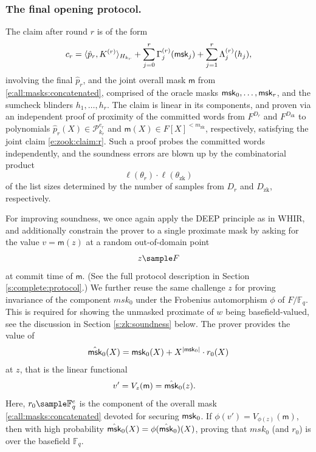 \subsubsection{The final opening protocol.}

The claim after round $r$ is of the form
\begin{equation}
\label{e:zook:claim:r}
c_r  = \langle \hat p_r, K^{(r)} \rangle_{H_{k_r}} 
+ \sum_{j=0}^r  \Gamma_j^{(r)}(\mathsf{msk}_j) + \sum_{j=1}^r \Lambda_j^{(r)}(h_j),
\end{equation}
involving the final $\hat p_r$, and the joint overall mask $\mathsf m$ from \eqref{e:all:masks:concatenated}, comprised of the oracle masks $\mathsf{msk}_0,\ldots,\mathsf{msk}_r$, and the sumcheck blinders $h_1,\ldots, h_r$.
The claim is linear in its components, and proven via an independent proof of proximity of the committed words from $F^{D_r}$ and $F^{D_\text{zk}}$ to polynomials $\hat p_r(X)\in \mathscr P_{k_r}^{e_r}$ and $\mathsf m(X) \in F[X]^{<m_\text{zk}}$, respectively, satisfying the joint claim \eqref{e:zook:claim:r}.
Such a proof probes the committed words independently, and the soundness errors are blown up by the combinatorial product
\[
\ell(\theta_r) \cdot \ell(\theta_\text{zk})
\]
of the list sizes determined by the number of samples from $D_r$ and $D_\text{zk}$, respectively.

For improving soundness, we once again apply the DEEP principle as in WHIR, and additionally constrain the prover to a single proximate mask by asking for the value 
$
v =\mathsf m(z)
$
at a random out-of-domain point 
\begin{equation}
z\sample F
\end{equation} at commit time of $\mathsf m$. 
(See the full protocol description in Section \ref{s:complete:protocol}.)
We further reuse the same challenge $z$ for proving invariance of the component $msk_0$ under the Frobenius automorphism $\phi$ of $F/\mathbb F_q$. 
This is required for showing the unmasked proximate of $w$ being basefield-valued, see the discussion in Section \ref{s:zk:soundness} below.\footnotemark
{}
The prover provides the value of 
\begin{align}
\hat{\mathsf{msk}}_0(X) = \mathsf{msk}_0(X) + X^{|\mathsf{msk}_0|}\cdot r_0(X)
\end{align}
at $z$, that is the linear functional
\begin{align}
\label{e:zook:final:opening:V:z}
v' = V_z(\mathsf m) &=  \hat{\mathsf{msk}}_0(z).
\end{align}
Here, $r_0\sample\mathbb F_q^e$ is the component of the overall mask \eqref{e:all:masks:concatenated} devoted for securing $\mathsf{msk}_0$.
If $\phi(v') = V_{\phi(z)}(\mathsf m)$, then with high probability $\hat {\mathsf{msk}}_0(X) = \phi(\hat{\mathsf{msk}}_0)(X)$, proving that $msk_0$ (and $r_0$) is over the basefield $\mathbb F_q$.

